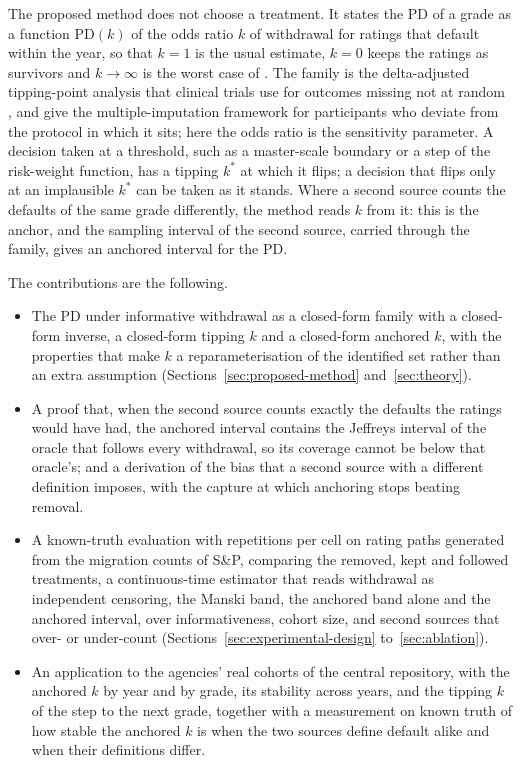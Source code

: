 The proposed method does not choose a treatment. It states the PD of a grade as a function $\mathrm{PD}(k)$ of the odds ratio $k$ of withdrawal for ratings that default within the year, so that $k=1$ is the usual estimate, $k=0$ keeps the \wdn{} ratings as survivors and $k\to\infty$ is the worst case of \citet{manski1989}. The family is the delta-adjusted tipping-point analysis that clinical trials use for outcomes missing not at random \citep{cro2020}, and \citet{carpenter2013} give the multiple-imputation framework for participants who deviate from the protocol in which it sits; here the odds ratio is the sensitivity parameter. A decision taken at a threshold, such as a master-scale boundary or a step of the risk-weight function, has a tipping $k^{*}$ at which it flips; a decision that flips only at an implausible $k^{*}$ can be taken as it stands. Where a second source counts the defaults of the same grade differently, the method reads $k$ from it: this is the anchor, and the sampling interval of the second source, carried through the family, gives an anchored interval for the PD.

The contributions are the following.
\begin{itemize}
\item The PD under informative withdrawal as a closed-form family with a closed-form inverse, a closed-form tipping $k$ and a closed-form anchored $k$, with the properties that make $k$ a reparameterisation of the identified set rather than an extra assumption (Sections~\ref{sec:proposed-method} and~\ref{sec:theory}).
\item A proof that, when the second source counts exactly the defaults the \wdn{} ratings would have had, the anchored interval contains the Jeffreys interval of the oracle that follows every withdrawal, so its coverage cannot be below that oracle's; and a derivation of the bias that a second source with a different definition imposes, with the capture at which anchoring stops beating removal.
\item A known-truth evaluation with  repetitions per cell on rating paths generated from the migration counts of S\&P, comparing the removed, kept and followed treatments, a continuous-time estimator that reads withdrawal as independent censoring, the Manski band, the anchored band alone and the anchored interval, over informativeness, cohort size, and second sources that over- or under-count (Sections~\ref{sec:experimental-design} to~\ref{sec:ablation}).
\item An application to the agencies' real cohorts of the central repository, with the anchored $k$ by year and by grade, its stability across years, and the tipping $k$ of the step to the next grade, together with a measurement on known truth of how stable the anchored $k$ is when the two sources define default alike and when their definitions differ.
\end{itemize}

